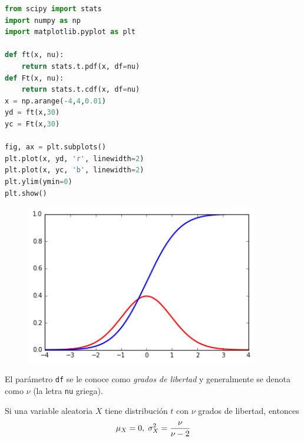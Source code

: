 \begin{lstlisting}[language=Python, caption=Distribución $t$ en \texttt{Python}]
from scipy import stats
import numpy as np
import matplotlib.pyplot as plt

def ft(x, nu):
    return stats.t.pdf(x, df=nu)
def Ft(x, nu):
    return stats.t.cdf(x, df=nu)
x = np.arange(-4,4,0.01)
yd = ft(x,30)
yc = Ft(x,30)

fig, ax = plt.subplots()
plt.plot(x, yd, 'r', linewidth=2)
plt.plot(x, yc, 'b', linewidth=2)
plt.ylim(ymin=0)
plt.show()
\end{lstlisting}



\begin{figure}[h]
 \centering
 \includegraphics[height=7cm,keepaspectratio=true]{./images/tCDF.png}
\end{figure}



El parámetro \texttt{df} se le conoce como \emph{grados de libertad} y generalmente se denota como $\nu$ (la letra \texttt{nu} griega).


 Si una variable aleatoria $X$ tiene distribución $t$ con $\nu$ grados de libertad, entonces
 \begin{align}
  \mu_{X}=0, \; \sigma^{2}_{X}=\dfrac{\nu}{\nu-2}
 \end{align}





